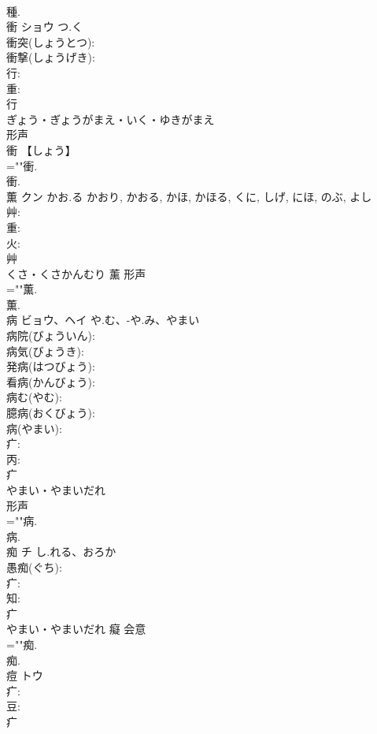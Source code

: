 \documentclass[8pt]{extreport}
\begin{document}
\begin{CJK}{UTF8}{min}
\\	種.
\\	衝	ショウ	つ.く		
\\	衝突(しょうとつ): 
\\	衝撃(しょうげき): 
\\	行: 
\\	重: 
\\	行	
\\	ぎょう・ぎょうがまえ・いく・ゆきがまえ	
\\	形声 
\\	衝 【しょう】 
\\	=""衝.
\\	衝.
\\	薫	クン	かお.る	かおり, かおる, かほ, かほる, くに, しげ, にほ, のぶ, よし	
\\	艸: 
\\	重: 
\\	火: 
\\	艸	
\\	くさ・くさかんむり	薰	形声 
\\	=""薫.
\\	薫.
\\	病	ビョウ、ヘイ	や.む、-や.み、やまい		
\\	病院(びょういん): 
\\	病気(びょうき): 
\\	発病(はつびょう): 
\\	看病(かんびょう): 
\\	病む(やむ): 
\\	臆病(おくびょう): 
\\	病(やまい): 
\\	疒: 
\\	丙: 
\\	疒	
\\	やまい・やまいだれ	
\\	形声 
\\	=""病.
\\	病.
\\	痴	チ	し.れる、おろか		
\\	愚痴(ぐち): 
\\	疒: 
\\	知: 
\\	疒	
\\	やまい・やまいだれ	癡	会意 
\\	=""痴.
\\	痴.
\\	痘	トウ			
\\	疒: 
\\	豆: 
\\	疒	

\end{CJK}
\end{document}
